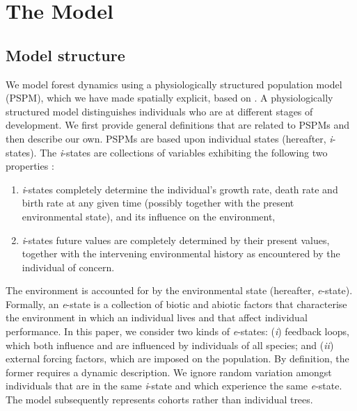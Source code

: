 

\section{The Model}
\subsection{Model structure}
We model forest dynamics using a physiologically structured population model (PSPM), which we have made spatially explicit, based on \citet{Strigul2008}. A physiologically structured model distinguishes individuals who are at different stages of development. We first provide general definitions that are related to PSPMs and then describe our own. PSPMs are based upon individual states (hereafter, \textit{i}-states). The \textit{i}-states are collections of variables exhibiting the following two properties \citep[for an overview of PSPMs]{DeRoos1997}:
\begin{enumerate}[label=(\roman*)]
	\item \textit{i}-states completely determine the individual's growth rate, death rate and birth rate  at any given time (possibly together with the present environmental state), and its influence on the environment,
	\item \textit{i}-states future values are completely determined by their present values, together with the intervening environmental history as encountered by the individual of concern.
\end{enumerate}
The environment is accounted for by the environmental state (hereafter, \textit{e}-state). Formally, an \textit{e}-state is a collection of biotic and abiotic factors that characterise the environment in which an individual lives and that affect individual performance. In this paper, we consider two kinds of \textit{e}-states: (\textit{i}) feedback loops, which both influence and are influenced by individuals of all species; and (\textit{ii}) external forcing factors, which are imposed on the population. By definition, the former requires a dynamic description. We ignore random variation amongst individuals that are in the same \textit{i}-state and which experience the same \textit{e}-state. The model subsequently represents cohorts rather than individual trees.

